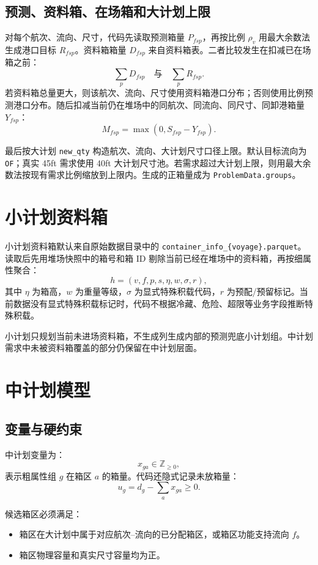 \documentclass[UTF8,a4paper,11pt]{ctexart}
\newcommand{\code}[1]{\nolinkurl{#1}}
\begin{document}
\subsection{预测、资料箱、在场箱和大计划上限}

对每个航次、流向、尺寸，代码先读取预测箱量 \(P_{fsp}\)，再按比例 \(\rho_v\) 用最大余数法生成港口目标 \(R_{fsp}\)。资料箱箱量 \(D_{fsp}\) 来自资料箱表。二者比较发生在扣减已在场箱之前：
\[
\sum_p D_{fsp}
\quad\text{与}\quad
\sum_p R_{fsp}.
\]
若资料箱总量更大，则该航次、流向、尺寸使用资料箱港口分布；否则使用比例预测港口分布。随后扣减当前仍在堆场中的同航次、同流向、同尺寸、同卸港箱量 \(Y_{fsp}\)：
\[
M_{fsp}=\max(0,S_{fsp}-Y_{fsp}).
\]

最后按大计划 \code{new\_qty} 构造航次、流向、大计划尺寸口径上限。默认目标流向为 \code{OF}；真实 45ft 需求使用 40ft 大计划尺寸池。若需求超过大计划上限，则用最大余数法按现有需求比例缩放到上限内。生成的正箱量成为 \code{ProblemData.groups}。

\section{小计划资料箱}

小计划资料箱默认来自原始数据目录中的 \code{container_info_\{voyage\}.parquet}。读取后先用堆场快照中的箱号和箱 ID 剔除当前已经在堆场中的资料箱，再按细属性聚合：
\[
h=(v,f,p,s,\eta,w,\sigma,r),
\]
其中 \(\eta\) 为箱高，\(w\) 为重量等级，\(\sigma\) 为显式特殊积载代码，\(r\) 为预配/预留标记。当前数据没有显式特殊积载标记时，代码不根据冷藏、危险、超限等业务字段推断特殊积载。

小计划只规划当前未进场资料箱，不生成列生成内部的预测兜底小计划组。中计划需求中未被资料箱覆盖的部分仍保留在中计划层面。

\section{中计划模型}

\subsection{变量与硬约束}

中计划变量为：
\[
x_{ga}\in \mathbb{Z}_{\ge 0},
\]
表示粗属性组 \(g\) 在箱区 \(a\) 的箱量。代码还隐式记录未放箱量：
\[
u_g=d_g-\sum_a x_{ga}\ge 0.
\]

候选箱区必须满足：
\begin{itemize}
  \item 箱区在大计划中属于对应航次--流向的已分配箱区，或箱区功能支持流向 \(f\)。
  \item 箱区物理容量和真实尺寸容量均为正。
\end{itemize}
\end{document}
